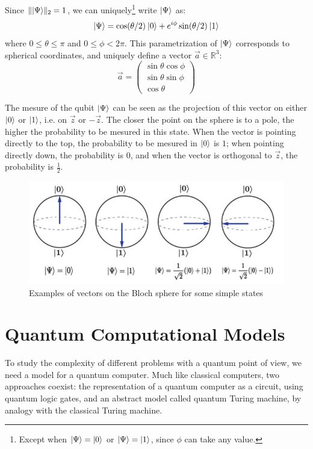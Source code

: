 \documentclass[12pt,a4paper]{article}
\theoremstyle{plain}
\theoremstyle{definition}
\DeclarePairedDelimiter\ket{\lvert}{\rangle}
\begin{document}
Since $\|\ket{\Psi}\|_2=1$, we can uniquely\footnote{Except when $\ket{\Psi}=\ket{0}$ or $\ket{\Psi}=\ket{1}$, since $\phi$ can take any value.} write $\ket{\Psi}$ as:
\begin{equation*}
    \ket{\Psi}=\cos(\theta/2)\:\ket{0} + e^{i\phi}\sin(\theta/2)\: \ket{1}
\end{equation*}
where $0\leq\theta\leq\pi$ and $0\leq\phi<2\pi$. This parametrization of $\ket{\Psi}$ corresponds to spherical coordinates, and uniquely define a vector $\vec{a}\in\mathbb{R}^3$:
\begin{equation*}
    \vec{a}=\begin{pmatrix}\sin\theta\cos\phi\\\sin\theta\sin\phi\\\cos\theta\end{pmatrix}
\end{equation*}

The mesure of the qubit $\ket{\Psi}$ can be seen as the projection of this vector on either $\ket{0}$ or $\ket{1}$, i.e. on $\vec{z}$ or $-\vec{z}$. The closer the point on the sphere is to a pole, the higher the probability to be mesured in this state. When the vector is pointing directly to the top, the probability to be mesured in $\ket{0}$ is $1$; when pointing directly down, the probability is $0$, and when the vector is orthogonal to $\vec{z}$, the probability is $\frac{1}{2}$.

\begin{figure}[!ht]
    \centering
    \includegraphics*[scale=0.4]{bloch-examples.png}
    \caption{Examples of vectors on the Bloch sphere for some simple states}
\end{figure}

\section{Quantum Computational Models}
To study the complexity of different problems with a quantum point of view, we need a model for a quantum computer. Much like classical computers, two approaches coexist: the representation of a quantum computer as a circuit, using quantum logic gates, and an abstract model called quantum Turing machine, by analogy with the classical Turing machine.
\end{document}
